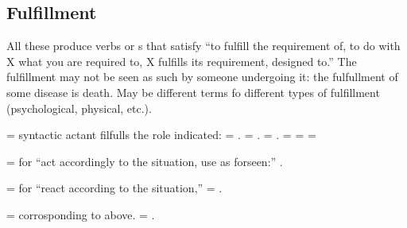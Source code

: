 \subsection{Fulfillment}
All these produce verbs or s that satisfy ``to fulfill the
requirement of, to do with X what you are required to, X fulfills its
requirement, designed to.'' The fulfillment may not be seen as such by
someone undergoing it: the fulfullment of some disease is death.  May
be different terms fo different types of fulfillment (psychological,
physical, etc.).

\begin{multicols}{2}
 = syntactic actant  filfulls the role indicated:
 = .
 = .
 = .
 = 
 = 
 = 

 =  for ``act accordingly to the situation, use as
forseen:'' .

 =  for ``react according to the situation,''
 = . 

 =  corrosponding to  above.
 = .
\end{multicols}


